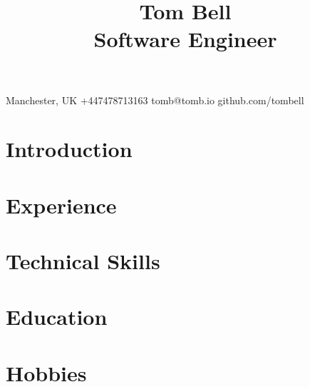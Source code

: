 \documentclass{article}
\begin{document}
\title{Tom Bell \\
  \large Software Engineer}
\author{}
\date{}

\maketitle

\begin{center}
  \small
  \raisebox{-0.1\height}{\normalsize\faMapMarker} Manchester, UK
  \hspace{0.2cm}
  \raisebox{-0.1\height}{\normalsize\faMobile} +447478713163
  \hspace{0.2cm}
  \raisebox{-0.1\height}{\normalsize\faAt} tomb@tomb.io
  \hspace{0.2cm}
  \raisebox{-0.1\height}{\normalsize\faGithubAlt} github.com/tombell
\end{center}

\section{Introduction}
\section{Experience}
\section{Technical Skills}
\section{Education}
\section{Hobbies}
\end{document}
